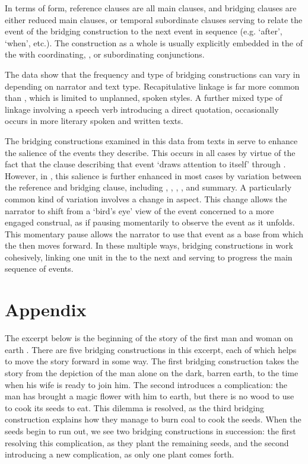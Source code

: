 \documentclass[output=paper]{LSP/langsci}
\begin{document}
In terms of form, reference clauses are all main clauses, and bridging clauses are either reduced main clauses, or temporal subordinate clauses serving to relate the event of the bridging construction to the next event in sequence (e.g. `after', `when', etc.). The construction as a whole is usually explicitly embedded in the   of the  with coordinating, , or subordinating conjunctions.

The data show that the frequency and type of bridging constructions can vary in  depending on narrator and text type. Recapitulative linkage is far more common than , which is limited to unplanned, spoken styles. A further mixed type of linkage involving a speech verb introducing a direct quotation, occasionally occurs in more literary spoken and written texts.

The bridging constructions examined in this data from  texts in  serve to enhance the salience of the events they describe. This occurs in all cases by virtue of the fact that the clause describing that event `draws attention to itself' \citep[][210]{kress06} through . However, in , this salience is further enhanced in most cases by variation between the reference and bridging clause, including , , , , and summary. A particularly common kind of variation involves a change in aspect. This change allows the narrator to shift from a ‘bird’s eye’ view of the event concerned to a more engaged construal, as if pausing momentarily to observe the event as it unfolds. This momentary pause allows the narrator to use that event as a base from which the  then moves forward. In these multiple ways, bridging constructions in  work cohesively, linking one unit in the  to the next and serving to progress the main sequence of events. 

 \section*{Appendix}
 \setcounter{equation}{0}
 
The excerpt below is the beginning of the story of the first man and woman on earth \citep[][3--4]{johnson92}. There are five bridging constructions in this excerpt, each of which helps to move the story forward in some way. The first bridging construction takes the story from the depiction of the man alone on the dark, barren earth, to the time when his wife is ready to join him. The second introduces a complication: the man has brought a magic flower with him to earth, but there is no wood to use to cook its seeds to eat. This dilemma is resolved, as the third bridging construction explains how they manage to burn coal to cook the seeds. When the seeds begin to run out, we see two bridging constructions in succession: the first resolving this complication, as they plant the remaining seeds, and the second introducing a new complication, as only one plant comes forth.
\end{document}

